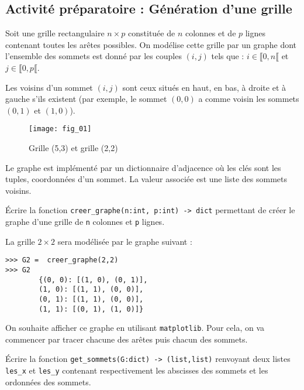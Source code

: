 \subsection*{Activité préparatoire : Génération d'une grille}

Soit une grille rectangulaire $n\times p$ constituée de $n$ colonnes et de $p$ lignes contenant toutes les arêtes possibles. On modélise cette grille par un graphe dont l'ensemble des sommets est donné par les couples $(i,j)$ tels que : $i\in\llbracket 0,n \llbracket $ et $j\in\llbracket 0,p \llbracket $.

Les voisins d'un sommet $(i,j)$ sont ceux situés en haut, en bas, à droite et à gauche s'ils existent (par exemple, le sommet $(0,0)$ a comme voisin les sommets $(0,1)$ et $(1,0)$).



\begin{figure}[!h]\centering
\texttt{[image: fig\_01]}
\caption{Grille (5,3) et grille (2,2)}
\end{figure}

Le graphe est implémenté par un dictionnaire d'adjacence où les clés sont les tuples, coordonnées d'un sommet. La valeur associée est une liste des sommets voisins. 


\begin{question}
Écrire la fonction \lstinline{creer_graphe(n:int, p:int) -> dict} permettant de créer le graphe d'une grille de \lstinline{n} colonnes et \lstinline{p} lignes.
\end{question}

\begin{exemple}
La grille $ 2 \times 2$ sera modélisée par le graphe suivant :

\begin{lstlisting}
>>> G2 =  creer_graphe(2,2)
>>> G2
        {(0, 0): [(1, 0), (0, 1)],
        (1, 0): [(1, 1), (0, 0)],
        (0, 1): [(1, 1), (0, 0)],
        (1, 1): [(0, 1), (1, 0)]}
\end{lstlisting}
\end{exemple}

On souhaite afficher ce graphe en utilisant \lstinline{matplotlib}. Pour cela, on va commencer par tracer chacune des arêtes puis chacun des sommets. 

\begin{question}Écrire la fonction \lstinline{get_sommets(G:dict) -> (list,list)} renvoyant deux listes \lstinline{les_x} et \lstinline{les_y} contenant respectivement les abscisses des sommets et les ordonnées des sommets.
\end{question}


